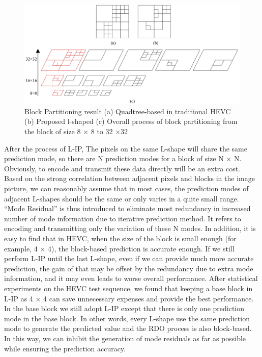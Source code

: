 \documentclass[journal]{IEEEtran}
\begin{document}
\begin{figure}[htpb]
\centering
\includegraphics[width=14cm]{pictures/partitioning process}
\caption{Block Partitioning result (a) Quadtree-based in traditional HEVC (b) Proposed l-shaped (c) Overall process of block partitioning from the block of size 8 × 8 to 32 ×32}
\label{fig:partitioning}
\end{figure}
After the process of L-IP, The pixels on the same L-shape will share the same prediction mode, so there are N prediction modes for a block of size N × N. Obviously, to encode and transmit these data directly will be an extra cost. Based on the strong correlation between adjacent pixels and blocks in the image picture, we can reasonably assume that in most cases, the prediction modes of adjacent L-shapes should be the same or only varies in a quite small range. “Mode Residual” is thus introduced to eliminate most redundancy in increased number of mode information due to iterative prediction method. It refers to encoding and transmitting only the variation of these N modes. In addition, it is easy to find that in HEVC, when the size of the block is small enough (for example, 4 × 4), the block-based prediction is accurate enough. If we still perform L-IP until the last L-shape, even if we can provide much more accurate prediction, the gain of that may be offset by the redundancy due to extra mode information, and it may even leads to worse overall performance. After statistical experiments on the HEVC test sequence, we found that keeping a base block in L-IP as 4 × 4 can save unnecessary expenses and provide the best performance. In the base block we still adopt L-IP except that there is only one  prediction mode in the base block. In other words, every L-shape use the same prediction mode to generate the predicted value and the RDO process is also block-based. In this way, we can inhibit the generation of mode residuals as far as possible while ensuring the prediction accuracy.
\end{document}
